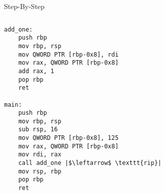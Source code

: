 \documentclass[hyphens,aspectratio=169]{beamer}
\begin{document}
\begin{frame}[fragile]{Step-By-Step}
    \begin{columns}
        \begin{column}{0.33\textwidth}
            \begin{verbatim}
add_one:
    push rbp
    mov rbp, rsp
    mov QWORD PTR [rbp-0x8], rdi
    mov rax, QWORD PTR [rbp-0x8]
    add rax, 1
    pop rbp
    ret

main:
    push rbp
    mov rbp, rsp
    sub rsp, 16
    mov QWORD PTR [rbp-0x8], 125
    mov rax, QWORD PTR [rbp-0x8]
    mov rdi, rax
    call add_one |$\leftarrow$ \texttt{rip}|
    mov rsp, rbp
    pop rbp
    ret
            \end{verbatim}
        \end{column}
        \begin{column}{0.33\textwidth}
\end{column}
\end{columns}
\end{frame}
\end{document}
